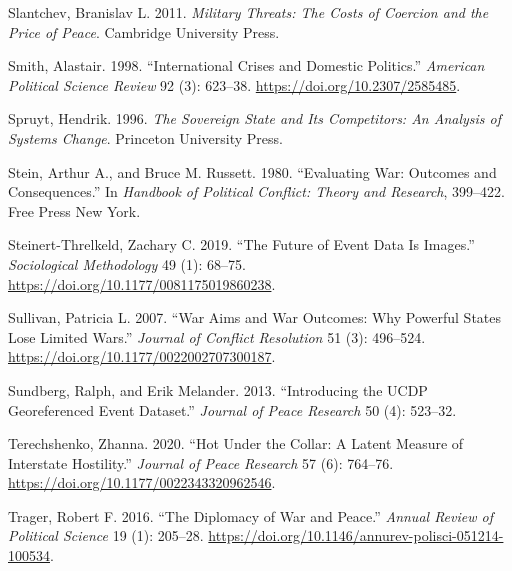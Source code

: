 \documentclass{article}
\newlength{\cslhangindent}
\newlength{\cslentryspacingunit} %
\newenvironment{CSLReferences}[2] %
 {%
  \setlength{\parindent}{0pt}
  \ifodd #1
  \let\oldpar\par
  \def\par{\hangindent=\cslhangindent\oldpar}
  \fi
  \setlength{\parskip}{#2\cslentryspacingunit}
 }%
 {}
\begin{document}
\begin{CSLReferences}{1}{0}
\leavevmode{}%
Slantchev, Branislav L. 2011. \emph{Military Threats: The Costs of
Coercion and the Price of Peace}. {Cambridge University Press}.

\leavevmode{}%
Smith, Alastair. 1998. {``International {Crises} and {Domestic
Politics}.''} \emph{American Political Science Review} 92 (3): 623--38.
\url{https://doi.org/10.2307/2585485}.

\leavevmode{}%
Spruyt, Hendrik. 1996. \emph{The {Sovereign State} and {Its
Competitors}: {An Analysis} of {Systems Change}}. {Princeton University
Press}.

\leavevmode{}%
Stein, Arthur A., and Bruce M. Russett. 1980. {``Evaluating War:
{Outcomes} and Consequences.''} In \emph{Handbook of Political Conflict:
Theory and Research}, 399--422. {Free Press New York}.

\leavevmode{}%
Steinert-Threlkeld, Zachary C. 2019. {``The {Future} of {Event Data Is
Images}.''} \emph{Sociological Methodology} 49 (1): 68--75.
\url{https://doi.org/10.1177/0081175019860238}.

\leavevmode{}%
Sullivan, Patricia L. 2007. {``War {Aims} and {War Outcomes}: {Why
Powerful States Lose Limited Wars}.''} \emph{Journal of Conflict
Resolution} 51 (3): 496--524.
\url{https://doi.org/10.1177/0022002707300187}.

\leavevmode{}%
Sundberg, Ralph, and Erik Melander. 2013. {``Introducing the {UCDP}
Georeferenced Event Dataset.''} \emph{Journal of Peace Research} 50 (4):
523--32.

\leavevmode{}%
Terechshenko, Zhanna. 2020. {``Hot Under the Collar: {A} Latent Measure
of Interstate Hostility.''} \emph{Journal of Peace Research} 57 (6):
764--76. \url{https://doi.org/10.1177/0022343320962546}.

\leavevmode{}%
Trager, Robert F. 2016. {``The {Diplomacy} of {War} and {Peace}.''}
\emph{Annual Review of Political Science} 19 (1): 205--28.
\url{https://doi.org/10.1146/annurev-polisci-051214-100534}.


\end{CSLReferences}
\end{document}
